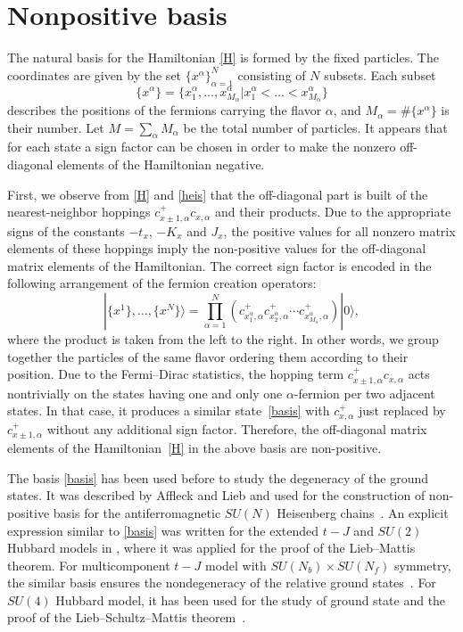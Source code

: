 \documentclass[pdftex]{sigma}
\begin{document}
\section{Nonpositive basis}\label{section3}

The natural basis for the Hamiltonian \eqref{H} is formed by the f\/ixed particles. The coordinates
are given by the set $\{x^\alpha\}_{\alpha=1}^N$ consisting of $N$  subsets. Each subset
\[
\{x^\alpha\}=\{x^\alpha_1,\dots,x^\alpha_{M_\alpha} | x^\alpha_1<\dots <x^\alpha_{M_\alpha}\}
\]
describes the positions of the fermions carrying the f\/lavor $\alpha$, and $M_\alpha=\#\{x^\alpha\}$
is their number. Let  $M=\sum_\alpha M_\alpha$
be the total number of particles.
It appears that for each state a sign factor can be
chosen in order to make the nonzero of\/f-diagonal elements of the Hamiltonian
negative.

First, we observe from \eqref{H} and \eqref{heis} that the of\/f-diagonal part is built of
the nearest-neighbor hoppings $c^+_{x\pm1,\alpha}c_{x,\alpha}$ and their products.
Due to the appropriate signs of the
constants $-t_x$, $-K_x$ and $J_x$,
the positive values for all nonzero  matrix elements of these hoppings
imply  the non-positive values for the of\/f-diagonal matrix elements of the Hamiltonian.
The correct sign factor is encoded in the following arrangement of the fermion creation operators:
\begin{equation}
\label{basis}
|\{x^1\},\dots,\{x^N\}\rangle =
\prod_{\alpha=1}^N (c^+_{x^\alpha_1,\alpha}c^+_{x^\alpha_2,\alpha}\cdots c^+_{x^\alpha_{M_\alpha},\alpha}) |0\rangle,
\end{equation}
where the product is taken from the left to the right. In other words, we group together the particles
of the same f\/lavor ordering them according to their position.
Due to the Fermi--Dirac statistics, the hopping term  $c^+_{x\pm1,\alpha}c_{x,\alpha}$ acts
nontrivially on the states having one and only one $\alpha$-fermion per two adjacent states.
In that case, it produces a similar state~\eqref{basis} with $c^+_{x,\alpha}$ just replaced by $c^+_{x\pm1,\alpha}$
without any additional sign factor.
Therefore, the of\/f-diagonal matrix elements of the  Hamiltonian~\eqref{H} in the above basis are non-positive.

The basis \eqref{basis} has been used before to study the degeneracy of the ground states.
It was described by Af\/f\/leck and Lieb and used for the
construction of  non-positive basis for the antiferromagnetic $SU(N)$ Heisenberg chains~\cite{AL86}.
An  explicit expression similar to \eqref{basis} was written
for the extended $t-J$ and $SU(2)$ Hubbard models in \cite{Amb92-1,Amb92-2}, where it
was applied for the proof of the Lieb--Mattis theorem.
For multicomponent $t-J$ model with $SU(N_b)\times SU(N_f)$
symmetry, the similar basis ensures the nondegeneracy of the relative ground states~\cite{sorella96}.
For $SU(4)$ Hubbard model, it has been used for the study
of ground state and the proof of the Lieb--Schultz--Mattis theorem~\cite{LTML04}.
\end{document}
